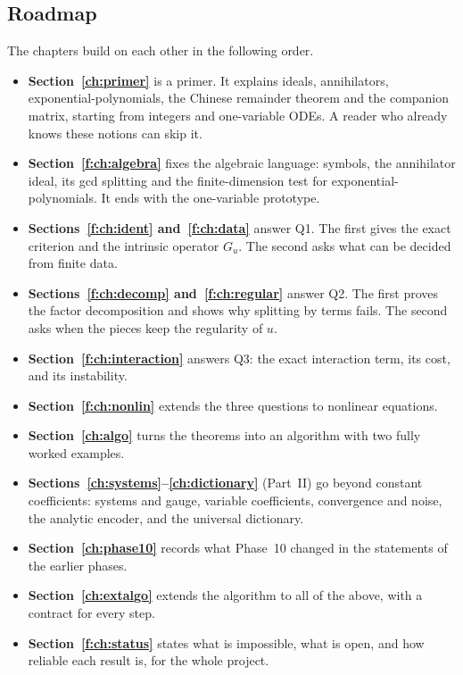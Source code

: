 \documentclass[11pt]{article}
\theoremstyle{plain}
\theoremstyle{definition}
\theoremstyle{remark}
\begin{document}
\subsection{Roadmap}

The chapters build on each other in the following order.
\begin{itemize}
\item \textbf{Section~\ref{ch:primer}} is a primer. It explains ideals, annihilators, exponential-polynomials, the Chinese remainder theorem and the companion matrix, starting from integers and one-variable ODEs. A reader who already knows these notions can skip it.
\item \textbf{Section~\ref{f:ch:algebra}} fixes the algebraic language: symbols, the annihilator ideal, its gcd splitting and the finite-dimension test for exponential-polynomials. It ends with the one-variable prototype.
\item \textbf{Sections~\ref{f:ch:ident} and~\ref{f:ch:data}} answer Q1. The first gives the exact criterion and the intrinsic operator $G_u$. The second asks what can be decided from finite data.
\item \textbf{Sections~\ref{f:ch:decomp} and~\ref{f:ch:regular}} answer Q2. The first proves the factor decomposition and shows why splitting by terms fails. The second asks when the pieces keep the regularity of $u$.
\item \textbf{Section~\ref{f:ch:interaction}} answers Q3: the exact interaction term, its cost, and its instability.
\item \textbf{Section~\ref{f:ch:nonlin}} extends the three questions to nonlinear equations.
\item \textbf{Section~\ref{ch:algo}} turns the theorems into an algorithm with two fully worked examples.
\item \textbf{Sections~\ref{ch:systems}--\ref{ch:dictionary}} (Part~II) go beyond constant coefficients: systems and gauge, variable coefficients, convergence and noise, the analytic encoder, and the universal dictionary.
\item \textbf{Section~\ref{ch:phase10}} records what Phase~10 changed in the statements of the earlier phases.
\item \textbf{Section~\ref{ch:extalgo}} extends the algorithm to all of the above, with a contract for every step.
\item \textbf{Section~\ref{f:ch:status}} states what is impossible, what is open, and how reliable each result is, for the whole project.
\end{itemize}
\end{document}
